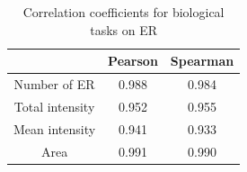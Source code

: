 \begin{table}[htb]
    \centering
    \caption{Correlation coefficients for biological tasks on ER}
        \begin{adjustbox}{width=0.4\textwidth}
            \begin{tabular}{|c|c|c|}\hline
                &Pearson&Spearman
                \\\hline\hline
                Number of ER & 0.988 & 0.984\\\hline
                Total intensity&0.952&0.955\\\hline
                Mean intensity&0.941&0.933\\\hline
                Area &0.991&0.990\\\hline
            \end{tabular}
        \label{table:er-downstream-metrics-coefficients}
        \end{adjustbox}
\end{table}
